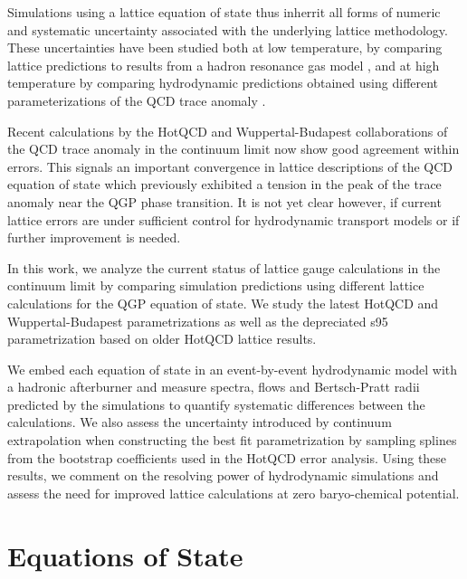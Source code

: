 \documentclass[aps,prc,reprint,amsmath,nofootinbib,superscriptaddress]{revtex4-1}
\begin{document}
Simulations using a lattice equation of state thus inherrit all forms of numeric and systematic uncertainty associated 
with the underlying lattice methodology. These uncertainties have been studied both at low temperature, by comparing lattice predictions to results from a hadron 
resonance gas model \cite{Huovinen:2009yb}, and at high temperature by comparing hydrodynamic predictions obtained using different 
parameterizations of the QCD trace anomaly \cite{Huovinen:2005gy, Huovinen:2009yb}. 


Recent calculations by the HotQCD and Wuppertal-Budapest collaborations of the QCD trace anomaly in the continuum limit now show good agreement 
within errors. This signals an important convergence in lattice descriptions of the QCD equation of state which previously exhibited a tension 
in the peak of the trace anomaly near the QGP phase transition. It is not yet clear however, if current lattice errors are under sufficient 
control for hydrodynamic transport models or if further improvement is needed.  

In this work, we analyze the current status of lattice gauge calculations in the continuum limit by comparing simulation predictions using 
different lattice calculations for the QGP equation of state. We study the latest HotQCD and Wuppertal-Budapest parametrizations as well as 
the depreciated s95 parametrization based on older HotQCD lattice results. 

We embed each equation of state in an event-by-event hydrodynamic model with a hadronic afterburner and measure spectra, flows and Bertsch-Pratt 
radii predicted by the simulations to quantify systematic differences between the calculations. We also assess the uncertainty introduced by 
continuum extrapolation when constructing the best fit parametrization by sampling splines from the bootstrap coefficients used in the HotQCD 
error analysis. Using these results, we comment on the resolving power of hydrodynamic simulations and assess the need for improved lattice 
calculations at zero baryo-chemical potential.

\section{Equations of State}
\end{document}
